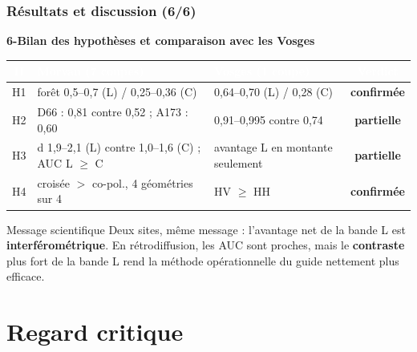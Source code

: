 \documentclass[aspectratio=169]{beamer}
\newcommand{\slidesubtitle}[1]{%
	\textcolor{myblue}{\small\textbf{#1}}%
	\par\vspace{3pt}%
}
\begin{document}
\begin{frame}{\phantom{x}}
	\frametitle{Résultats et discussion (6/6)}
	\slidesubtitle{6-Bilan des hypothèses et comparaison avec les Vosges}
	\centering
	\renewcommand{\arraystretch}{1.3}
	\setlength{\tabcolsep}{4pt}
	\footnotesize
	\begin{tabular}{|c|p{5.2cm}|p{5.0cm}|c|}
		\hline
		\rowcolor{myblue}\textcolor{white}{\textbf{H}} & \textcolor{white}{\textbf{Morvan (7 coupes)}} &
		\textcolor{white}{\textbf{Vosges (1 coupe)}} & \textcolor{white}{\textbf{Verdict}} \\
		\hline
		H1 & forêt 0,5--0,7 (L) / 0,25--0,36 (C) & 0,64--0,70 (L) / 0,28 (C) & \textcolor{mygreen}{\textbf{confirmée}} \\
		\hline
		H2 & D66 : 0,81 contre 0,52 ; A173 : 0,60 & 0,91--0,995 contre 0,74 & \textcolor{myorange}{\textbf{partielle}} \\
		\hline
		H3 & d 1,9--2,1 (L) contre 1,0--1,6 (C) ; AUC L $\geq$ C & avantage L en montante seulement &
		\textcolor{myorange}{\textbf{partielle}} \\
		\hline
		H4 & croisée $>$ co-pol., 4 géométries sur 4 & HV $\geq$ HH & \textcolor{mygreen}{\textbf{confirmée}} \\
		\hline
	\end{tabular}

	\vspace{0.8em}
	\begin{alertblock}{Message scientifique}
		\small Deux sites, même message : l'avantage net de la bande L est \textbf{interférométrique}. En
		rétrodiffusion, les AUC sont proches, mais le \textbf{contraste} plus fort de la bande L rend la méthode
		opérationnelle du guide nettement plus efficace.
	\end{alertblock}
\end{frame}

\section{Regard critique}
\end{document}
